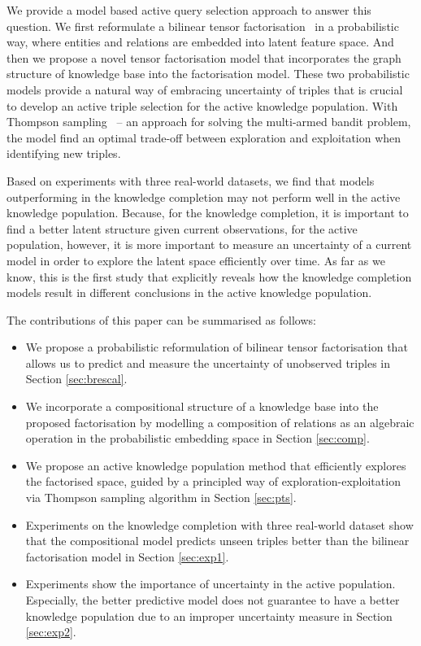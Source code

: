 We provide a model based active query selection approach to answer this question. We first reformulate a bilinear tensor factorisation~\cite{nickel2015review} in a probabilistic way, where entities and relations are embedded into latent feature space. And then we propose a novel tensor factorisation model that incorporates the graph structure of knowledge base into the factorisation model. These two probabilistic models provide a natural way of embracing uncertainty of triples that is crucial to develop 
an active triple selection for the active knowledge population.
With Thompson sampling~\cite{scott10bandit} -- an approach for solving the multi-armed bandit problem,
the model find an optimal trade-off between exploration and exploitation when identifying new triples.

Based on experiments with three real-world datasets, we find that models outperforming in the knowledge completion may not perform well in the active knowledge population. Because, for the knowledge completion, it is important to find a better latent structure given current observations, for the active population, however, it is more important to measure an uncertainty of a current model in order to explore the latent space efficiently over time.
As far as we know, this is the first study that explicitly reveals how the knowledge completion models result in different conclusions in the active knowledge population.

The contributions of this paper can be summarised as follows:
\begin{itemize}
\item We propose a probabilistic reformulation of bilinear tensor factorisation that allows us to predict and measure the uncertainty of unobserved triples in Section \ref{sec:brescal}.
\item We incorporate a compositional structure of a knowledge base into the proposed factorisation by modelling a composition of relations as an algebraic operation in the probabilistic embedding space in Section \ref{sec:comp}.
\item We propose an active knowledge population method that efficiently explores the factorised space, guided by a principled way of exploration-exploitation via Thompson sampling algorithm in Section \ref{sec:pts}.
\item Experiments on the knowledge completion with three real-world dataset show that the compositional model predicts unseen triples better than the bilinear factorisation model in Section \ref{sec:exp1}.
\item Experiments show the importance of uncertainty in the active population. Especially, the better predictive model does not guarantee to have a better knowledge population due to an improper uncertainty measure in Section \ref{sec:exp2}.
\end{itemize}

